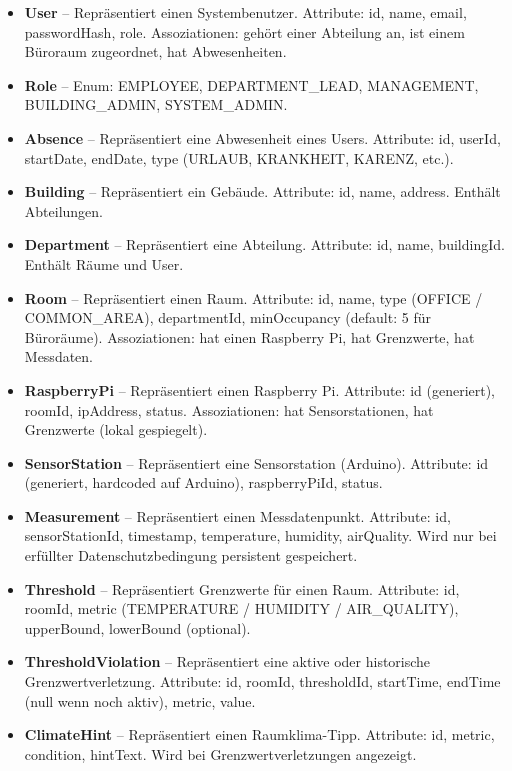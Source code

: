 \documentclass[12pt,a4paper]{article}
\begin{document}
\begin{itemize}
  \item \textbf{User} -- Repräsentiert einen Systembenutzer. Attribute: id, name, email, passwordHash, role. Assoziationen: gehört einer Abteilung an, ist einem Büroraum zugeordnet, hat Abwesenheiten.
  \item \textbf{Role} -- Enum: EMPLOYEE, DEPARTMENT\_LEAD, MANAGEMENT, BUILDING\_ADMIN, SYSTEM\_ADMIN.
  \item \textbf{Absence} -- Repräsentiert eine Abwesenheit eines Users. Attribute: id, userId, startDate, endDate, type (URLAUB, KRANKHEIT, KARENZ, etc.).
  \item \textbf{Building} -- Repräsentiert ein Gebäude. Attribute: id, name, address. Enthält Abteilungen.
  \item \textbf{Department} -- Repräsentiert eine Abteilung. Attribute: id, name, buildingId. Enthält Räume und User.
  \item \textbf{Room} -- Repräsentiert einen Raum. Attribute: id, name, type (OFFICE / COMMON\_AREA), departmentId, minOccupancy (default: 5 für Büroräume). Assoziationen: hat einen Raspberry Pi, hat Grenzwerte, hat Messdaten.
  \item \textbf{RaspberryPi} -- Repräsentiert einen Raspberry Pi. Attribute: id (generiert), roomId, ipAddress, status. Assoziationen: hat Sensorstationen, hat Grenzwerte (lokal gespiegelt).
  \item \textbf{SensorStation} -- Repräsentiert eine Sensorstation (Arduino). Attribute: id (generiert, hardcoded auf Arduino), raspberryPiId, status.
  \item \textbf{Measurement} -- Repräsentiert einen Messdatenpunkt. Attribute: id, sensorStationId, timestamp, temperature, humidity, airQuality. Wird nur bei erfüllter Datenschutzbedingung persistent gespeichert.
  \item \textbf{Threshold} -- Repräsentiert Grenzwerte für einen Raum. Attribute: id, roomId, metric (TEMPERATURE / HUMIDITY / AIR\_QUALITY), upperBound, lowerBound (optional).
  \item \textbf{ThresholdViolation} -- Repräsentiert eine aktive oder historische Grenzwertverletzung. Attribute: id, roomId, thresholdId, startTime, endTime (null wenn noch aktiv), metric, value.
  \item \textbf{ClimateHint} -- Repräsentiert einen Raumklima-Tipp. Attribute: id, metric, condition, hintText. Wird bei Grenzwertverletzungen angezeigt.

\end{itemize}
\end{document}
